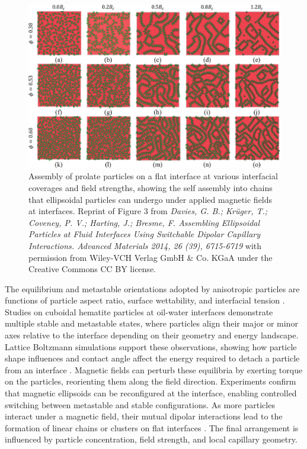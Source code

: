 \begin{figure}
    \centering
    \includegraphics[scale = 0.4]{figures/introduction/anisotropic_particles_assembly.jpg}
    \caption{Assembly of prolate particles on a flat interface at various interfacial coverages and field strengths,
             showing the self assembly into chains that ellipsoidal particles can undergo under applied magnetic fields at
             interfaces. Reprint of Figure 3 from
             \textit{Davies, G. B.; Krüger, T.; Coveney, P. V.; Harting, J.; Bresme, F. Assembling Ellipsoidal Particles at Fluid Interfaces Using Switchable Dipolar Capillary Interactions. Advanced Materials 2014, 26 (39), 6715-6719}
             with permission from Wiley-VCH Verlag GmbH \& Co. KGaA under the Creative Commons CC BY license.}
    \label{fig:anisotropic_assembly}
\end{figure}

The equilibrium and metastable orientations adopted by anisotropic particles are functions of particle aspect ratio, surface wettability, and interfacial tension 
\cite{morgan_understanding_2013, newton_influence_2014}. Studies on cuboidal hematite particles at oil-water interfaces demonstrate multiple stable and metastable states, where particles align 
their major or minor axes relative to the interface depending on their geometry and energy landscape. Lattice Boltzmann simulations support these observations, showing how particle shape influences 
and contact angle affect the energy required to detach a particle from an interface \cite{davies_detachment_2014}. 
Magnetic fields can perturb these equilibria by exerting torque on the particles, reorienting them along the field direction. 
Experiments confirm that magnetic ellipsoids can be reconfigured at the interface, enabling controlled switching between metastable and stable configurations.
As more particles interact under a magnetic field, their mutual dipolar interactions lead to the formation of linear chains or clusters on flat interfaces 
\cite{davies_assembling_2014, newton_capillary_2018}. The final arrangement is influenced by particle concentration, field strength, and local capillary geometry. 

